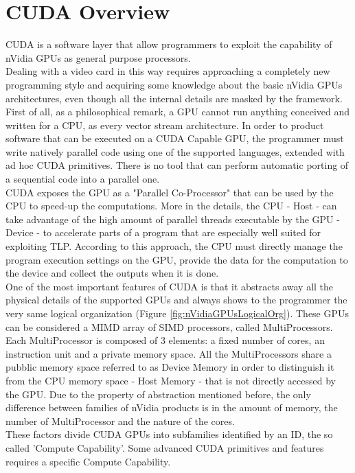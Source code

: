\chapter{CUDA Overview} \label{chap:cuda-overview}
CUDA is a software layer that allow programmers to exploit the capability of nVidia GPUs as general purpose processors.\\
Dealing with a video card in this way requires approaching a completely new programming style and acquiring some knowledge about the basic nVidia GPUs architectures, even though all the internal details are masked by the framework.\\
First of all, as a philosophical remark, a GPU cannot run anything conceived and written for a CPU, as every vector stream architecture. In order to product software that can be executed on a CUDA Capable GPU, the programmer must write natively parallel code using one of the supported languages, extended with ad hoc CUDA primitives. There is no tool that can perform automatic porting of a sequential code into a parallel one.\\
CUDA exposes the GPU as a "Parallel Co-Processor" that can be used by the CPU to speed-up the computations. More in the details, the CPU - Host - can take advantage of the high amount of parallel threads executable by the GPU - Device - to accelerate parts of a program that are especially well suited for exploiting TLP. According to this approach, the CPU must directly manage the program execution settings on the GPU, provide the data for the computation to the device and collect the outputs when it is done.\\
One of the most important features of CUDA is that it abstracts away all the physical details of the supported GPUs and always shows to the programmer  the very same logical organization (Figure \ref{fig:nVidiaGPUsLogicalOrg}). These GPUs can be considered a MIMD array of SIMD processors, called MultiProcessors. Each MultiProcessor is composed of 3 elements: a fixed number of cores, an instruction unit and a private memory space. All the MultiProcessors share a pubblic memory space referred to as Device Memory in order to distinguish it from the CPU memory space - Host Memory - that is not directly accessed by the GPU. Due to the property of abstraction mentioned before, the only difference between families of nVidia products is in the amount of memory, the number of MultiProcessor and the nature of the cores.\\
These factors divide CUDA GPUs into subfamilies identified by an ID, the so called 'Compute Capability'. Some advanced CUDA primitives and features requires a specific Compute Capability.\\  
